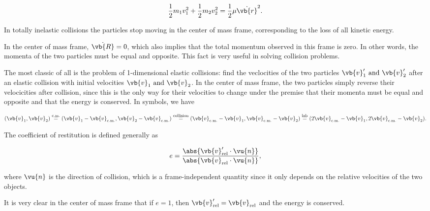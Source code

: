 \documentclass[a4paper,12pt]{report}
\begin{document}
\begin{equation}
	\frac{1}{2} m_1 v_1 ^2+ \frac{1}{2} m_2 v_2 ^2 = \frac{1}{2} \mu \dot{\vb{r} }^2.  
\end{equation}

In totally inelastic collisions the particles stop moving in the center of mass frame, corresponding to the loss of all kinetic energy.




In the center of mass frame, \(\dot{\vb{R} } = 0\), which also implies that the total momentum observed in this frame is zero. In other words, the momenta of the two particles must be equal and opposite. This fact is very useful in solving collision problems.

The most classic of all is the problem of 1-dimensional elastic collisions: find the veclocities of the two particles \(\vb{v} _{1}' \text { and } \vb{v} _{2}'  \)  after an elastic collision with initial velocities \(\vb{v} _{1} \text { and } \vb{v} _{2}  \). In the center of mass frame, the two particles simply reverse their velocicities after collision, since this is the only way for their velocities to change under the premise that their momenta must be equal and opposite and that the energy is conserved. In symbols, we have 

\begin{equation}
	(\vb{v} _{1}, \vb{v} _{2}  ) \stackrel{\text{c.m.} }{=} (\vb{v} _{1} - \vb{v} _{\text{c.m.} }, \vb{v} _{2} - \vb{v} _{\text{c.m.} }) \stackrel{\text{collision} }{=} (\vb{v} _{\text{c.m.} } - \vb{v} _{1}, \vb{v} _{\text{c.m.} }- \vb{v} _{2}    ) \stackrel{\text{lab} }{=} (2\vb{v} _{\text{c.m.} }- \vb{v} _{1}, 2\vb{v} _{\text{c.m.} }- \vb{v} _{2} ).
\end{equation}

The coefficient of restitution is defined generally as

\begin{equation}
	e = \frac{\abs{\vb{v} _{\text{rel} }'  \cdot \vu{n} } }{\abs{\vb{v} _{\text{rel} } \cdot \vu{n} } },
\end{equation}

where \(\vu{n} \) is the direction of collision, which is a frame-independent quantity since it only depends on the relative velocities of the two objects.

It is very clear in the center of mass frame that if \(e = 1\), then \(\vb{v} _{\text{rel} }' = \vb{v} _{\text{rel} } \) and the energy is conserved.   
\end{document}
